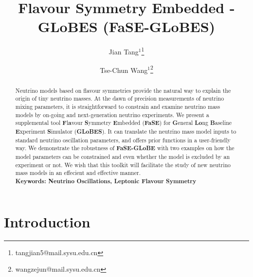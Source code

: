 \documentclass[aps,prd,nofootinbib,preprint]{revtex4}
\begin{document}
 
\title{Flavour Symmetry Embedded - GLoBES (FaSE-GLoBES)} %
\author{Jian Tang$^1$\footnote{tangjian5@mail.sysu.edu.cn}}
\author{Tse-Chun Wang$^1$\footnote{wangzejun@mail.sysu.edu.cn}}

\begin{abstract}
Neutrino models based on flavour symmetries provide the natural way to explain the origin of tiny neutrino masses. At the dawn of precision measurements of neutrino mixing parameters, it is straightforward to constrain and examine neutrino mass models by on-going and next-generation neutrino experiments. We present a supplemental tool \textbf{F}l\textbf{a}vour \textbf{S}ymmetry \textbf{E}mbedded (\textbf{FaSE}) for \textbf{G}eneral \textbf{Lo}ng \textbf{B}aseline \textbf{E}xperiment \textbf{S}imulator (\textbf{GLoBES}). It can translate the neutrino mass model inputs to standard neutrino oscillation parameters, and offers prior functions in a user-friendly way. We demonstrate the robustness of \textbf{FaSE-GLoBE} with two examples on how the model parameters can be constrained and even whether the model is excluded by an experiment or not. We wish that this toolkit will facilitate the study of new neutrino mass models in an effecient and effective manner.\\
\textbf{Keywords: Neutrino Oscillations, Leptonic Flavour Symmetry}  
\end{abstract} 

\maketitle

\section{Introduction}\label{sec:intro}
\end{document}
